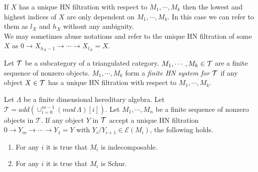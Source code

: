 \indent If $X$ has a unique HN filtration with respect to $M_1,\cdots, M_k$ then the lowest and highest indices of $X$ are only dependent on $M_1,\cdots, M_k$. In this case we can refer to them as $l_X$ and $h_X$ without any ambiguity.\\
\indent We may sometimes abuse notations and refer to the unique HN filtration of some $X$ as $0\to X_{h_X-1}\to\cdots\to X_{l_X} = X$.\\
\begin{definition}
Let $\mathcal{T}$ be a subcategory of a triangulated category. $M_1,\cdots, M_k\in \mathcal{T}$ are a finite sequence of nonzero objects. $M_1,\cdots, M_k$ form a \textit{finite HN system for $\mathcal{T}$} if any object $X\in\mathcal{T}$ has a unique HN filtration with respect to $M_1,\cdots, M_k$.
\end{definition}
\begin{lemma}\label{lem:C3L3}
Let $\Lambda$ be a finite dimensional hereditary algebra. Let $\mathcal{T} = add(\cup_{i=0}^{m-1} (mod\,\Lambda)[i])$. Let $M_1,\cdots, M_n$ be a finite sequence of nonzero objects in $\mathcal{T}$. If any object $Y$ in $\mathcal{T}$ accept a unique HN filtration $0\to Y_m\to\cdots\to Y_1=Y$ with $Y_i/Y_{i+1}\in \mathcal{E}(M_i)$, the following holds.
\begin{enumerate}
\item For any $i$ it is true that $M_i$ is indecomposable.
\item For any $i$ it is true that $M_i$ is Schur.
\end{enumerate}
\end{lemma}
